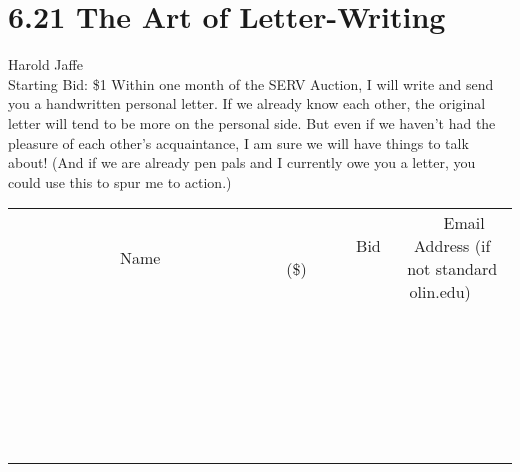 \documentclass[11pt]{article}
\begin{document}
\section*{6.21 The Art of Letter-Writing}
Harold Jaffe
\\
Starting Bid: \$1
\newline
Within one month of the SERV Auction, I will write and send you a handwritten personal letter. If we already know each other, the original letter will tend to be more on the personal side. But even if we haven't had the pleasure of each other's acquaintance, I am sure we will have things to talk about! (And if we are already pen pals and I currently owe you a letter, you could use this to spur me to action.)
\\[6ex]
\begin{tabular}{c c c}
~~~~~~~~~~~~~Name~~~~~~~~~~~~~ & ~~~~~~~~~Bid (\$)~~~~~~~~~  & ~~~Email Address (if not standard olin.edu)~~~\\
 & & \\
\hline
 & & \\
\hline
 & & \\
\hline
 & & \\
\hline
 & & \\
\hline
 & & \\
\hline
 & & \\
\hline
 & & \\
\hline
 & & \\
\hline
 & & \\
\hline
 & & \\
\hline
 & & \\
\hline
 & & \\
\hline
 & & \\
\hline
 & & \\
\hline
 & & \\
\hline
 & & \\
\hline
 & & \\
\hline
 & & \\
\hline
 & & \\
\hline
 & & \\
\hline
 & & \\
\hline
 & & \\
\hline
 & & \\
\hline
 & & \\
\hline
 & & \\
\hline
\end{tabular}
\newpage
\end{document}

